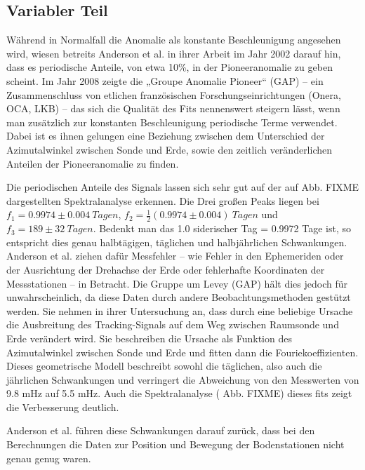 
\subsection{Variabler Teil}
Während in Normalfall die Anomalie als konstante Beschleunigung angesehen wird, wiesen betreits Anderson et al. in
ihrer Arbeit im Jahr 2002 darauf hin, dass es periodische Anteile, von etwa 10\%, in der Pioneeranomalie zu
geben scheint.
Im Jahr 2008 zeigte die „Groupe Anomalie Pioneer“ (GAP) – ein Zusammenschluss von etlichen französischen Forschungseinrichtungen (Onera, OCA, LKB) –
das sich die Qualität des Fits nennenswert steigern lässt, wenn man zusätzlich zur konstanten Beschleunigung
periodische Terme verwendet.
Dabei ist es ihnen gelungen eine Beziehung zwischen dem Unterschied der Azimutalwinkel zwischen Sonde und Erde, sowie
den zeitlich veränderlichen Anteilen der Pioneeranomalie zu finden. %

Die periodischen Anteile des Signals lassen sich sehr gut auf der auf Abb. FIXME dargestellten Spektralanalyse
erkennen. Die Drei großen Peaks liegen bei $f_1=0.9974\pm0.004\ Tagen$, $f_2=\frac12(0.9974\pm0.004)\ Tagen$ und 
$f_3=189\pm32\ Tagen$. Bedenkt man das 1.0 siderischer Tag = 0.9972 Tage ist, so entspricht dies genau
halbtägigen, täglichen und halbjährlichen Schwankungen.
Anderson et al. ziehen dafür Messfehler – wie Fehler in den Ephemeriden oder der Ausrichtung der Drehachse der Erde
oder fehlerhafte Koordinaten der Messstationen – in Betracht. %
Die Gruppe um Levey (GAP) hält dies jedoch für unwahrscheinlich, da diese Daten durch andere Beobachtungsmethoden
gestützt werden. %
Sie nehmen in ihrer Untersuchung an, dass durch eine beliebige Ursache die Ausbreitung des Tracking-Signals auf dem Weg
zwischen Raumsonde und Erde verändert wird. Sie beschreiben die Ursache als Funktion des Azimutalwinkel zwischen Sonde und Erde und fitten
dann die Fouriekoeffizienten. Dieses geometrische Modell beschreibt sowohl die täglichen, also auch die jährlichen
Schwankungen und verringert die Abweichung von den Messwerten von 9.8 mHz auf 5.5 mHz. Auch die Spektralanalyse (
Abb. FIXME) dieses fits zeigt die Verbesserung deutlich.\cite{Levy2008} %

Anderson et al. führen diese Schwankungen darauf zurück, dass bei den Berechnungen die Daten zur Position und Bewegung
der Bodenstationen nicht genau genug waren.\cite{Dittus2006} %

